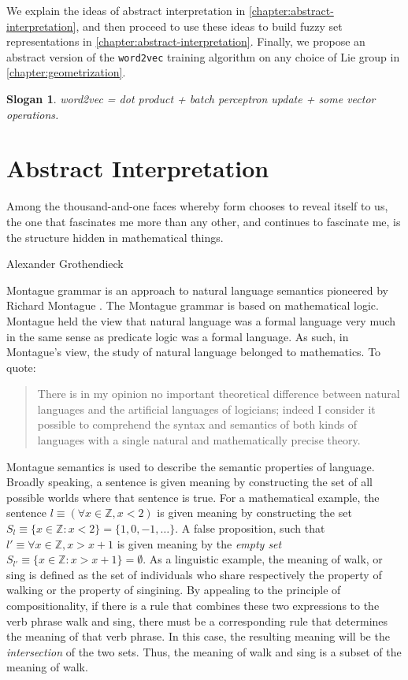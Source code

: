 \documentclass[11pt]{book}
\newcommand{\Z}{\ensuremath{\mathbb Z}}
\newtheorem{slogan}{Slogan}
\begin{document}
We explain the ideas of abstract interpretation in
\autoref{chapter:abstract-interpretation}, and then proceed to use these ideas
to build fuzzy set representations in
\autoref{chapter:abstract-interpretation}. Finally, we propose an abstract
version of the \texttt{word2vec} training algorithm on any choice of Lie group
in \autoref{chapter:geometrization}.

\begin{slogan}
    word2vec = dot product + batch perceptron update + some vector operations.
\end{slogan}

\chapter{Abstract Interpretation}
\label{chapter:abstract-interpretation}
\epigraph{Among the thousand-and-one faces whereby form chooses to reveal itself to us, the one that fascinates me more than any other, and continues to fascinate me, is the structure hidden in mathematical things.}{Alexander Grothendieck}


Montague grammar is an approach to natural language semantics pioneered by
Richard Montague \cite{sep-montague-semantics}. The Montague grammar is based
on mathematical logic.  Montague held the view that natural language was a
formal language very much in the same sense as predicate logic was a formal
language. As such, in Montague’s view, the study of natural language belonged
to mathematics. To quote:

\begin{quote} There is in my opinion no important theoretical difference
    between natural languages and the artificial languages of logicians; indeed
    I consider it possible to comprehend the syntax and semantics of both kinds
    of languages with a single natural and mathematically precise theory.
\end{quote}

Montague semantics is used to describe the semantic properties of language.
Broadly speaking, a sentence is given meaning by constructing the set of all
possible worlds where that sentence is true. For a mathematical example, the
sentence $l \equiv (\forall x \in \Z, x < 2)$ is given meaning by constructing
the set $S_l \equiv \{ x \in \Z : x < 2 \} = \{1, 0, -1, \dots \}$. A false
proposition, such that $l' \equiv \forall x \in \Z, x > x + 1$ is given meaning
by the \emph{empty set} $S_{l'} \equiv \{ x \in \Z: x > x + 1 \} = \emptyset$.
As a linguistic example, the meaning of walk, or sing is defined as the set of
individuals who share respectively the property of walking or the property of
singining.  By appealing to the principle of compositionality, if there is a
rule that combines these two expressions to the verb phrase walk and sing,
there must be a corresponding rule that determines the meaning of that verb
phrase. In this case, the resulting meaning will be the \emph{intersection} of
the two sets.  Thus, the meaning of walk and sing is a subset of the meaning of
walk.
\end{document}
